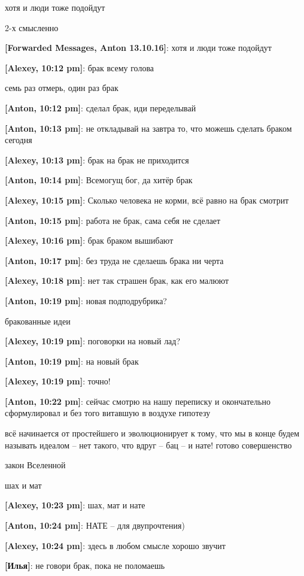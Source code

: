 \begin{flushleft}
хотя и люди тоже подойдут

2-х смысленно

\textbf{[Forwarded Messages, Anton 13.10.16]}: хотя и люди тоже подойдут

\textbf{[Alexey, 10:12 pm]}: брак всему голова

семь раз отмерь, один раз брак

\textbf{[Anton, 10:12 pm]}: сделал брак, иди переделывай

\textbf{[Anton, 10:13 pm]}: не откладывай на завтра то, что можешь сделать браком сегодня

\textbf{[Alexey, 10:13 pm]}: брак на брак не приходится

\textbf{[Anton, 10:14 pm]}: Всемогущ бог, да хитёр брак

\textbf{[Alexey, 10:15 pm]}: Сколько человека не корми, всё равно на брак смотрит

\textbf{[Anton, 10:15 pm]}: работа не брак, сама себя не сделает

\textbf{[Alexey, 10:16 pm]}: брак браком вышибают

\textbf{[Anton, 10:17 pm]}: без труда не сделаешь брака ни черта

\textbf{[Alexey, 10:18 pm]}: нет так страшен брак, как его малюют

\textbf{[Anton, 10:19 pm]}: новая подподрубрика?

бракованные идеи

\textbf{[Alexey, 10:19 pm]}: поговорки на новый лад?

\textbf{[Anton, 10:19 pm]}: на новый брак

\textbf{[Alexey, 10:19 pm]}: точно!

\textbf{[Anton, 10:22 pm]}: сейчас смотрю на нашу переписку и окончательно сформулировал и без того витавшую в воздухе гипотезу

всё начинается от простейшего и эволюционирует к тому, что мы в конце будем называть идеалом -- нет такого, что вдруг -- бац -- и нате! готово совершенство

закон Вселенной

шах и мат

\textbf{[Alexey, 10:23 pm]}: шах, мат и нате

\textbf{[Anton, 10:24 pm]}: НАТЕ -- для двупрочтения)

\textbf{[Alexey, 10:24 pm]}: здесь в любом смысле хорошо звучит
\endgroup

\textbf{[Илья]}: не говори брак, пока не поломаешь


\end{flushleft}
